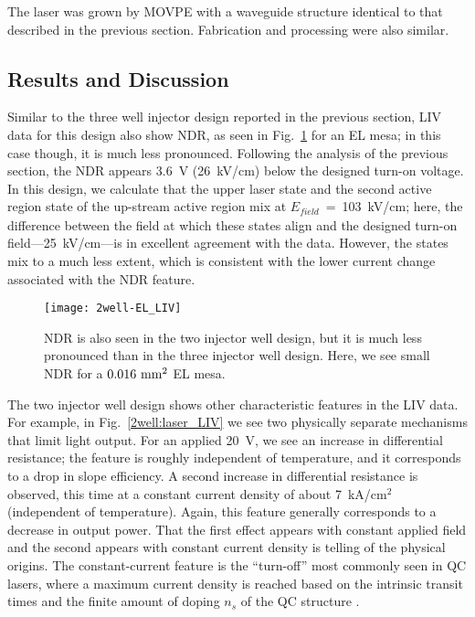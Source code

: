 The laser was grown by MOVPE with a waveguide structure identical to that described in the previous section.  Fabrication and processing were also similar.


\subsection{Results and Discussion}

Similar to the three well injector design reported in the previous section, LIV data for this design also show NDR, as seen in Fig.~\ref{2well:EL_LIV} for an EL mesa; in this case though, it is much less pronounced.  Following the analysis of the previous section, the NDR appears 3.6~V (26~kV/cm) below the designed turn-on voltage.  In this design, we calculate that the upper laser state and the second active region state of the up-stream active region mix at $E_\textit{field}$~=~103~kV/cm; here, the difference between the field at which these states align and the designed turn-on field---25~kV/cm---is in excellent agreement with the data.  However, the states mix to a much less extent, which is consistent with the lower current change associated with the NDR feature.

\begin{figure}[tp]
\centering
\texttt{[image: 2well-EL\_LIV]}
\caption[LIV for a two injector well EL sample]{ NDR is also seen in the two injector well design, but it is much less pronounced than in the three injector well design.  Here, we see small NDR for a $0.016~\textnormal{mm}^2$ EL mesa.}
\label{2well:EL_LIV}
\end{figure}

The two injector well design shows other characteristic features in the LIV data.  For example, in Fig.~\ref{2well:laser_LIV} we see two physically separate mechanisms that limit light output.  For an applied 20~V, we see an increase in differential resistance; the feature is roughly independent of temperature, and it corresponds to a drop in slope efficiency.  A second increase in differential resistance is observed, this time at a constant current density of about 7~kA/cm$^2$ (independent of temperature).  Again, this feature generally corresponds to a decrease in output power.  That the first effect appears with constant applied field and the second appears with constant current density is telling of the physical origins.  The constant-current feature is the ``turn-off'' most commonly seen in QC lasers, where a maximum current density is reached based on the intrinsic transit times and the finite amount of doping $n_s$ of the QC structure \cite{Aellen:JAP:2006}.

